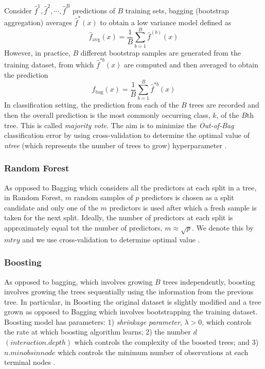 Consider $\hat{f}^1, \hat{f}^2, \cdots, \hat{f}^B$ predictions of $B$ training sets, bagging (bootstrap aggregation) averages $\hat{f}^*(x)$ to obtain a low variance model defined as
\[
\hat{f}_{\text{avg}}(x) = \frac{1}{B}\sum^{B}_{b=1}{\hat{f}^{(b)}(x)}
\]
However, in practice, $B$ different bootstrap samples are generated from the training dataset, from which $\hat{f}^{*b}(x)$ are computed and then averaged to obtain the prediction 
\[
\hat{f}_{\text{bag}}(x) = \frac{1}{B}\sum^{B}_{b=1}{\hat{f}^{*b}(x)}
\]
In classification setting, the prediction from each of the $B$ trees are recorded and then the overall prediction is the most commonly occurring class, $k$, of the $B$th tree. This is called \textit{majority vote}. The aim is to minimize the \textit{Out-of-Bag} classification error by using cross-validation to determine  the optimal value of \textit{ntree} (which represents the number of trees to grow) hyperparameter \citep{james2013introduction}.

\subsubsection{Random Forest}

As opposed to Bagging which considers all the predictors at each split in a tree, in Random Forest, $m$ random samples of $p$ predictors is chosen as a split candidate and only one of the $m$ predictors is used after which a fresh sample is taken for the next split. Ideally, the number of predictors at each split is approximately equal tot the number of predictors, $m\approx\sqrt{p}$. We denote this by $mtry$ and we use cross-validation to determine optimal value \citep{james2013introduction}. 

\subsubsection{Boosting}


As opposed to bagging, which involves growing $B$ trees independently, boosting involves growing the trees sequentially using the information from the previous tree. In particular, in Boosting the original dataset is slightly modified and a tree grown as opposed to Bagging which involves bootstrapping the training dataset. Boosting model has parameters: 1) \textit{shrinkage parameter}, $\lambda>0$, which controls the rate at which boosting algorithm learns; 2) the number $d$ $(interaction.depth)$ which controls the complexity of the boosted trees; and 3) $n.minobsinnode$ which controls the minimum number of observations at each terminal nodes \citep{james2013introduction}.


